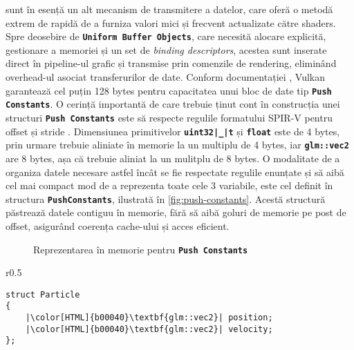  sunt în esență un alt mecanism de transmitere a datelor, care oferă o metodă extrem de rapidă de a furniza valori mici și frecvent actualizate către shaders. Spre deosebire de \textbf{\texttt{Uniform Buffer Objects}}, care necesită alocare explicită, gestionare a memoriei și un set de \textit{binding descriptors}, acestea sunt inserate direct în pipeline-ul grafic și transmise prin comenzile de rendering, eliminând overhead-ul asociat transferurilor de date. Conform documentației \cite{PushConstantsSizeLimits_citation}, Vulkan garantează cel puțin 128 bytes pentru capacitatea unui bloc de date tip \textbf{\texttt{Push Constants}}. O cerință importantă de care trebuie ținut cont în construcția unei structuri \textbf{\texttt{Push Constants}} este să respecte regulile formatului SPIR-V pentru offset și stride \cite{Offset-and-Stride-Assignment_citation}. Dimensiunea primitivelor \textbf{\texttt{uint32|\textcolor{black}{\_}|t}} și \textbf{\texttt{float}} este de 4 bytes, prin urmare trebuie aliniate în memorie la un multiplu de 4 bytes, iar \textbf{\texttt{glm::vec2}} are 8 bytes, așa că trebuie aliniat la un mulitplu de 8 bytes. O modalitate de a organiza datele necesare astfel încât se fie respectate regulile enunțate și să aibă cel mai compact mod de a reprezenta toate cele 3 variabile, este cel definit în structura \textbf{\texttt{PushConstants}}, ilustrată în \autoref{fig:push-constants}. Acestă structură păstrează datele contiguu în memorie, fără să aibă goluri de memorie pe post de offset, asigurând coerența cache-ului și acces eficient. 

\begin{figure}
    \centering
    
    \caption{Reprezentarea în memorie pentru \textbf{\texttt{Push Constants}}}
    \label{fig:push-constants}
\end{figure}

\vspace{1em}
\begin{wrapfigure}{r}{0.5\textwidth}
\vspace{-1em}
\hspace{1.2cm}
\begin{minipage}{\linewidth}
\begin{verbatim}
struct Particle
{
    |\color[HTML]{b00040}\textbf{glm::vec2}| position;
    |\color[HTML]{b00040}\textbf{glm::vec2}| velocity;
};
\end{verbatim}
\end{minipage}
\vspace{-1em}
\end{wrapfigure}

